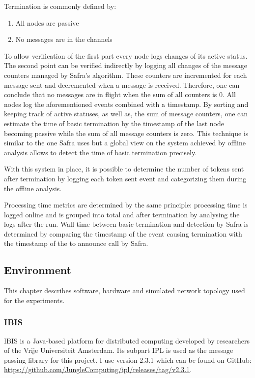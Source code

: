 Termination is commonly defined by:
\begin{enumerate}
    \item All nodes are passive
    \item No messages are in the channels
\end{enumerate}
To allow verification of the first part every node logs changes of its active status.
The second point can be verified indirectly by logging all changes of the message counters managed by Safra's algorithm.
These counters are incremented for each message sent and decremented when a message is received.
Therefore, one can conclude that no messages are in flight when the sum of all counters is 0.
All nodes log the aforementioned events combined with a timestamp.
By sorting and keeping track of active statuses, as well as, the sum of message counters, one can estimate the time of basic termination by the timestamp of the last node becoming passive while the sum of all message counters is zero.
This technique is similar to the one Safra uses but a global view on the system achieved by offline analysis allows to detect the time of basic termination precisely.

With this system in place, it is possible to determine the number of tokens sent after termination by logging each token sent event and categorizing them during the offline analysis.

Processing time metrics are determined by the same principle: processing time is logged online and is grouped into total and after termination by analysing the logs after the run.
Wall time between basic termination and detection by Safra is determined by comparing the timestamp of the event causing termination with the timestamp of the to announce call by Safra.

\subsection{Environment}
This chapter describes software, hardware and simulated network topology used for the experiments.
\subsubsection{IBIS}
IBIS is a Java-based platform for distributed computing developed by researchers of the Vrije Universiteit Amsterdam.
Its subpart IPL is used as the message passing library for this project.
I use version 2.3.1 which can be found on GitHub: \href{https://github.com/JungleComputing/ipl/releases/tag/v2.3.1}{https://github.com/JungleComputing/ipl/releases/tag/v2.3.1}.

